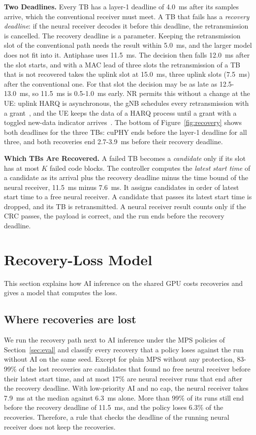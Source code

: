 \documentclass[acmsmall,screen,review,anonymous]{acmart}
\newcommand{\sys}{Antiphase\xspace}
\begin{document}
\noindent\textbf{Two Deadlines.} Every TB has a layer-1 deadline of 4.0~ms after its samples arrive, which
the conventional receiver must meet. A TB that fails has a \emph{recovery deadline}: if the neural receiver
decodes it before this deadline, the retransmission is cancelled. The recovery deadline is a parameter. Keeping the
retransmission slot of the conventional path needs the result within 5.0~ms, and the larger model does not
fit into it. \sys uses 11.5~ms. The decision then falls 12.0~ms after the slot starts, and with a MAC lead
of three slots the retransmission of a TB that is not recovered takes the uplink slot at 15.0~ms, three
uplink slots (7.5~ms) after the conventional one. For that slot the decision may be as late as
12.5-13.0~ms, so 11.5~ms is 0.5-1.0~ms early. NR permits this without a change at the UE: uplink HARQ is
asynchronous, the gNB schedules every retransmission with a grant~\cite{ts38300}, and the UE keeps the data
of a HARQ process until a grant with a toggled new-data indicator arrives~\cite{ts38321}. The
bottom of Figure~\ref{fig:recovery} shows both deadlines for the three TBs: cuPHY ends before the layer-1
deadline for all three, and both recoveries end 2.7-3.9~ms before their recovery deadline.

\noindent\textbf{Which TBs Are Recovered.} A failed TB becomes a \emph{candidate} only if its slot has at
most $K$ failed code blocks. The controller computes the \emph{latest start time} of a candidate as its
arrival plus the recovery deadline minus the time bound of the neural receiver, 11.5~ms minus 7.6~ms. It
assigns candidates in order of latest start time to a free neural receiver. A candidate that passes its
latest start time is dropped, and its TB is retransmitted. A neural receiver result counts only if the CRC
passes, the payload is correct, and the run ends before the recovery deadline.

\section{Recovery-Loss Model}
\label{sec:model}

This section explains how AI inference on the shared GPU costs recoveries and gives a model that computes
the loss.

\subsection{Where recoveries are lost}

We run the recovery path next to AI inference under the MPS policies of Section~\ref{sec:eval} and classify
every recovery that a policy loses against the run without AI on the same seed. Except for plain MPS
without any protection, 83-99\% of the lost recoveries are candidates that found no free neural receiver
before their latest start time, and at most 17\% are neural receiver runs that end after the recovery
deadline. With low-priority AI and no cap, the neural receiver takes 7.9~ms at the median against 6.3~ms
alone. More than 99\% of its runs still end before the recovery deadline of 11.5~ms, and the policy loses
6.3\% of the recoveries. Therefore, a rule that checks the deadline of the running neural receiver does not
keep the recoveries.
\end{document}
